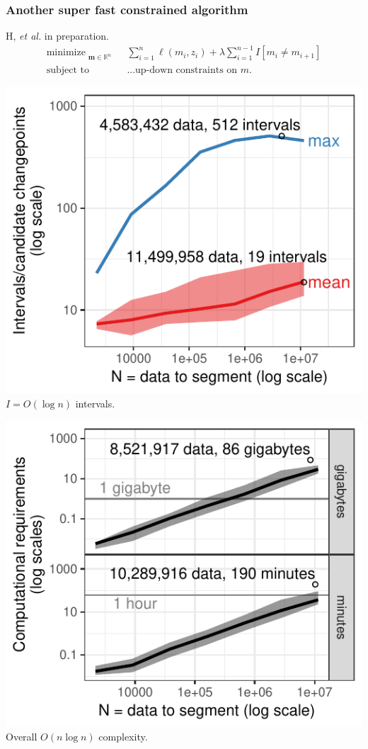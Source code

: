 \documentclass{beamer}
\DeclareMathOperator*{\minimize}{minimize}
\newcommand{\RR}{\mathbb R}
\begin{document}
\begin{frame}[fragile]
  \frametitle{Another super fast constrained algorithm }

  H, {\it et al.} in preparation.
\vskip -0.5cm
\begin{align*}
    \minimize_{\substack{
  \mathbf m\in\RR^{n}
  }} &\ \ 
    \sum_{i=1}^n \ell( m_i,  z_i)  + \lambda{\sum_{i=1}^{n-1}I[m_{i}\neq m_{i+1}]}
\\
      \text{subject to} &\ \ \text{...up-down constraints on $m$.}
  \nonumber 
\end{align*}

  \begin{minipage}{0.48\textwidth}
    \includegraphics[width=\textwidth]{jss-figure-target-intervals-models}
    $I=O(\log n)$ intervals.
  \end{minipage}
  \begin{minipage}{0.48\textwidth}
    \includegraphics[width=\textwidth]{jss-figure-target-intervals-models-computation}
    Overall  $O(n \log n)$ complexity.
  \end{minipage}
  


\end{frame}
\end{document}

